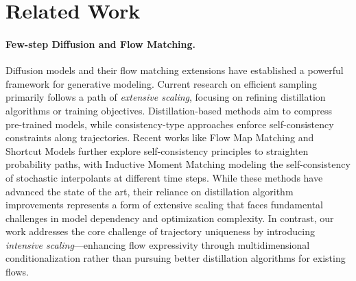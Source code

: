 \documentclass{article}
\theoremstyle{plain}
\theoremstyle{definition}
\theoremstyle{remark}
\begin{document}
\vspace{-5mm}
\section{Related Work}
\label{sec:related_work}
\vspace{-1mm}

\paragraph{Few-step Diffusion and Flow Matching.}
Diffusion models \cite{diffusion,song2019score,ddpm,scoresde} and their flow matching extensions \cite{lipman2022flow,albergo2023building,liu2022flow} have established a powerful framework for generative modeling. Current research on efficient sampling primarily follows a path of \textit{extensive scaling}, focusing on refining distillation algorithms or training objectives. Distillation-based methods \cite{salimans2022progressive,geng2024one,sauer2023adversarial,di,yin2024onestep} aim to compress pre-trained models, while consistency-type approaches \cite{cm,ict,ect,scm,yang2024consistency} enforce self-consistency constraints along trajectories. Recent works like Flow Map Matching \cite{boffi2024flow} and Shortcut Models \cite{frans2024one} further explore self-consistency principles to straighten probability paths, with Inductive Moment Matching \cite{imm} modeling the self-consistency of stochastic interpolants at different time steps. While these methods have advanced the state of the art, their reliance on distillation algorithm improvements represents a form of extensive scaling that faces fundamental challenges in model dependency and optimization complexity. In contrast, our work addresses the core challenge of trajectory uniqueness by introducing \textit{intensive scaling}—enhancing flow expressivity through multidimensional conditionalization rather than pursuing better distillation algorithms for existing flows.
\vspace{-4mm}
\end{document}
